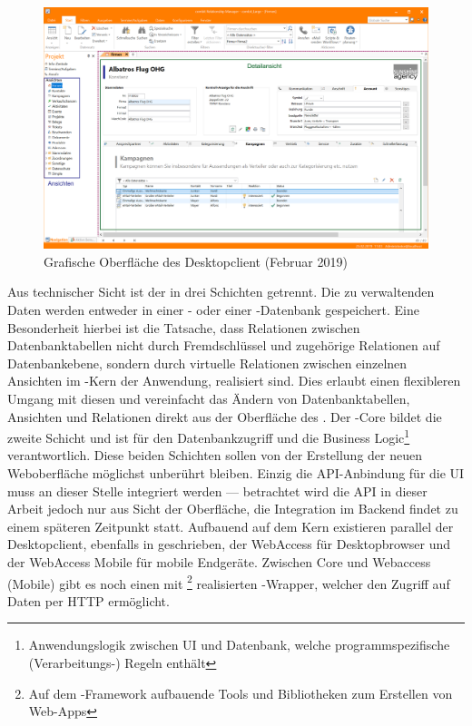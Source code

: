 \begin{figure}
    \centering
    \captionsetup{justification=centering}
    \includegraphics[width=\textwidth]{figures/crm_ui.png}
        \caption{Grafische Oberfläche des  Desktopclient (Februar 2019)}\label{fig:crm_ui}
\end{figure}

Aus technischer Sicht ist der  in drei Schichten getrennt. Die zu verwaltenden Daten werden entweder in einer - oder einer -Datenbank gespeichert. Eine Besonderheit hierbei ist die Tatsache, dass Relationen zwischen Datenbanktabellen nicht durch Fremdschlüssel und zugehörige Relationen auf Datenbankebene, sondern durch virtuelle Relationen zwischen einzelnen Ansichten im -Kern der Anwendung, realisiert sind. Dies erlaubt einen flexibleren Umgang mit diesen und vereinfacht das Ändern von Datenbanktabellen, Ansichten und Relationen direkt aus der Oberfläche des .
Der -Core bildet die zweite Schicht und ist für den Datenbankzugriff und die Business Logic\footnote{Anwendungslogik zwischen UI und Datenbank, welche programmspezifische (Verarbeitungs-) Regeln enthält} verantwortlich. Diese beiden Schichten sollen von der Erstellung der neuen Weboberfläche möglichst unberührt bleiben. Einzig die API-Anbindung für die UI muss an dieser Stelle integriert werden --- betrachtet wird die API in dieser Arbeit jedoch nur aus Sicht der Oberfläche, die Integration im Backend findet zu einem späteren Zeitpunkt statt.
Aufbauend auf dem Kern existieren parallel der Desktopclient, ebenfalls in  geschrieben, der WebAccess für Desktopbrowser und der WebAccess Mobile für mobile Endgeräte. Zwischen Core und Webaccess (Mobile) gibt es noch einen mit \footnote{Auf dem -Framework aufbauende Tools und Bibliotheken zum Erstellen von Web-Apps} realisierten -Wrapper, welcher den Zugriff auf Daten per HTTP ermöglicht.

